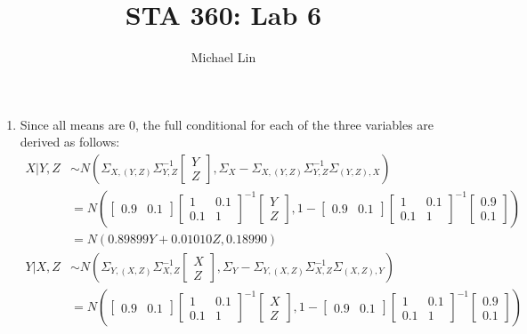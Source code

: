 \documentclass{article}
\title{STA 360: Lab 6}
\author{Michael Lin}
\begin{document}
\maketitle

\begin{enumerate}
\item Since all means are 0, the full conditional for each of the three variables are derived as follows:
\begin{align*}
X|Y,Z &\sim N(\Sigma_{X,(Y,Z)}\Sigma_{Y,Z}^{-1}\begin{bmatrix}
Y \\
Z
\end{bmatrix}, \Sigma_X-\Sigma_{X,(Y,Z)}\Sigma_{Y,Z}^{-1}\Sigma_{(Y,Z),X}) \\
&= N(\begin{bmatrix} 0.9& 0.1 \end{bmatrix} {\begin{bmatrix} 1& 0.1 \\ 0.1& 1 \end{bmatrix}}^{-1} \begin{bmatrix}Y \\Z\end{bmatrix},
1-\begin{bmatrix}0.9& 0.1 \end{bmatrix}{\begin{bmatrix} 1& 0.1 \\ 0.1& 1 \end{bmatrix}}^{-1}\begin{bmatrix}0.9\\0.1\end{bmatrix}) \\
&= N(0.89899Y+0.01010Z, 0.18990) \\
Y|X,Z &\sim N(\Sigma_{Y,(X,Z)}\Sigma_{X,Z}^{-1}\begin{bmatrix}
X \\
Z
\end{bmatrix}, \Sigma_Y-\Sigma_{Y,(X,Z)}\Sigma_{X,Z}^{-1}\Sigma_{(X,Z),Y}) \\
&= N(\begin{bmatrix} 0.9& 0.1 \end{bmatrix} {\begin{bmatrix} 1& 0.1 \\ 0.1& 1 \end{bmatrix}}^{-1} \begin{bmatrix}X \\Z\end{bmatrix},
1-\begin{bmatrix}0.9& 0.1 \end{bmatrix}{\begin{bmatrix} 1& 0.1 \\ 0.1& 1 \end{bmatrix}}^{-1}\begin{bmatrix}0.9\\0.1\end{bmatrix}) \\

\end{align*}
\end{enumerate}
\end{document}
